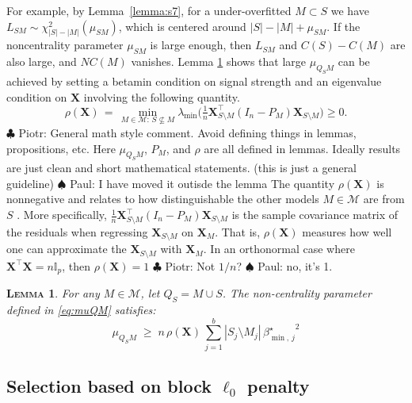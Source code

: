 \documentclass[aos]{imsart}
\theoremstyle{plain}
\newtheorem{lem}{\textsc{Lemma}}[section]
\newcommand{\piotr}[1]{{\small{\color{red} \sf $\clubsuit$ Piotr: #1}}}
\newcommand{\paul}[1]{{\small{\color{green} \sf $\spadesuit$ Paul: #1}}}
\newcommand{\I}{\mathbb{I}}
\newcommand{\M}{\mathcal{M}}
\newcommand{\bs}{\boldsymbol}
\begin{document}
For example, by Lemma~\ref{lemma:s7}, for a under-overfitted $M\subset S$ we have $L_{SM}\sim \chi^2_{|S|-|M|}(\mu_{SM})$, which is centered around $|S|-|M|+\mu_{SM}$.
If the noncentrality parameter $\mu_{SM}$ is large enough, then $L_{SM}$ and $C(S)-C(M)$ are also large, and $NC(M)$ vanishes. Lemma \ref{lem:boundrho} shows that large $\mu_{Q_SM}$ can be achieved by setting a betamin condition on signal strength and an eigenvalue condition on $\bs X$ involving the following quantity.  
 \begin{equation}\label{eq:rhoX}
        \rho(\bs X)\,=\,\min_{M \in \M:\, S \not \subseteq M} \lambda_{\min}\big(\tfrac{1}{n} \boldsymbol{X}_{S \setminus M}^{\top}\left(I_n- P_M\right) \boldsymbol{X}_{S \setminus M}\big) \geq 0.
    \end{equation}
\piotr{General math style comment. Avoid defining things in lemmas, propositions, etc. Here $\mu_{Q_SM}$, $P_M$, and $\rho$ are all defined in lemmas. Ideally results are just clean and short mathematical statements. (this is just a general guideline)} \paul{I have moved it outisde the lemma}
The quantity $\rho(\bs X)$ is nonnegative and relates to how distinguishable the other models $M\in \M$ are from $S$ \citep{infotheowainwright}.  More specifically, $\tfrac{1}{n} \boldsymbol{X}_{S \setminus M}^{\top}\left(I_n- P_M\right) \boldsymbol{X}_{S \setminus M}$ is the sample covariance matrix of the residuals when regressing $\boldsymbol{X}_{S \setminus M}$ on $\boldsymbol{X}_M$.
That is, $\rho(\bs X)$ measures how well one can approximate the 
$\boldsymbol{X}_{S \setminus M}$ with $\boldsymbol{X}_M$.
In an orthonormal case where $\bs X^{\top}\bs X=n\I_p$, then $\rho(\bs X)=1$\piotr{Not $1/n$?}\paul{no, it's 1}.  

\begin{lem}\label{lem:boundrho}
 For any $M\in\M$, let $Q_S=M \cup S$. The non-centrality parameter defined in \eqref{eq:muQM} satisfies: 
    \begin{equation}\label{eq:musmbound}
    \mu_{Q_SM}\; \geq \;n\,\rho(\bs X)\,\sum_{j=1}^b|S_j\setminus M_j|\,{\beta_{\min,\,j}^{\star}}^2
\end{equation}
\end{lem}



\subsection{Selection based on block $\ell_0$ penalty}
\label{ssec:regression_mainresult}
\end{document}
